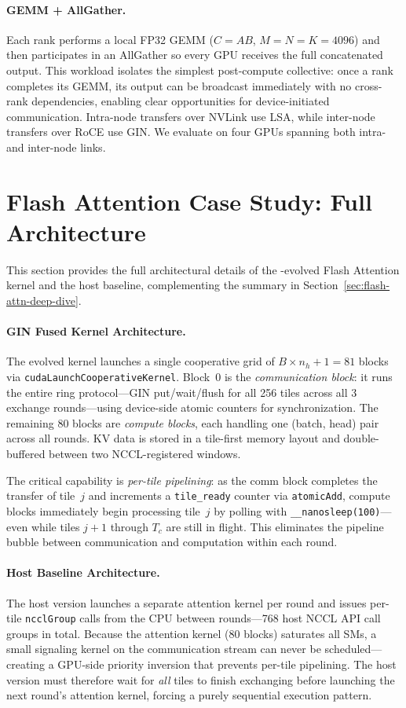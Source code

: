 \paragraph{GEMM + AllGather.}
Each rank performs a local FP32 GEMM ($C = AB$, $M{=}N{=}K{=}4096$) and then participates in an AllGather so every GPU receives the full concatenated output. This workload isolates the simplest post-compute collective: once a rank completes its GEMM, its output can be broadcast immediately with no cross-rank dependencies, enabling clear opportunities for device-initiated communication. Intra-node transfers over NVLink use LSA, while inter-node transfers over RoCE use GIN. We evaluate on four GPUs spanning both intra- and inter-node links.

\section{Flash Attention Case Study: Full Architecture}\label{sec:flash_attn_details}

This section provides the full architectural details of the \cufuse{}-evolved Flash Attention kernel and the host baseline, complementing the summary in Section~\ref{sec:flash-attn-deep-dive}.

\paragraph{GIN Fused Kernel Architecture.}
The \cufuse{} evolved kernel launches a single cooperative grid of $B \times n_h + 1 = 81$ blocks via \texttt{cudaLaunchCooperativeKernel}. Block~0 is the \emph{communication block}: it runs the entire ring protocol---GIN put/wait/flush for all 256 tiles across all 3 exchange rounds---using device-side atomic counters for synchronization. The remaining 80 blocks are \emph{compute blocks}, each handling one (batch, head) pair across all rounds. KV data is stored in a tile-first memory layout and double-buffered between two NCCL-registered windows.

The critical capability is \emph{per-tile pipelining}: as the comm block completes the transfer of tile~$j$ and increments a \texttt{tile\_ready} counter via \texttt{atomicAdd}, compute blocks immediately begin processing tile~$j$ by polling with \texttt{\_\_nanosleep(100)}---even while tiles $j\!+\!1$ through $T_c$ are still in flight. This eliminates the pipeline bubble between communication and computation within each round.

\paragraph{Host Baseline Architecture.}
The host version launches a separate attention kernel per round and issues per-tile \texttt{ncclGroup} calls from the CPU between rounds---768 host NCCL API call groups in total. Because the attention kernel (80 blocks) saturates all SMs, a small signaling kernel on the communication stream can never be scheduled---creating a GPU-side priority inversion that prevents per-tile pipelining. The host version must therefore wait for \emph{all} tiles to finish exchanging before launching the next round's attention kernel, forcing a purely sequential execution pattern.